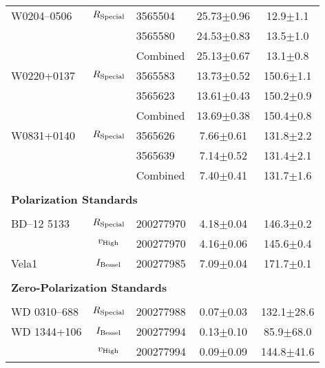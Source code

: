 \begin{table}
\begin{tabular}{lclcc}
        W0204--0506  & $R_{\rm Special}$ & 3565504   &           25.73$\pm$0.96 & \phantom{0}12.9$\pm$1.1 \\
                     &                   & 3565580   &           24.53$\pm$0.83 & \phantom{0}13.5$\pm$1.0 \\
                     &                   & Combined  &           25.13$\pm$0.67 & \phantom{0}13.1$\pm$0.8 \\
        W0220+0137   & $R_{\rm Special}$ & 3565583   &           13.73$\pm$0.52 &           150.6$\pm$1.1 \\
                     &                   & 3565623   &           13.61$\pm$0.43 &           150.2$\pm$0.9 \\
                     &                   & Combined  &           13.69$\pm$0.38 &           150.4$\pm$0.8 \\
        W0831+0140   & $R_{\rm Special}$ & 3565626   & \phantom{0}7.66$\pm$0.61 &           131.8$\pm$2.2 \\
                     &                   & 3565639   & \phantom{0}7.14$\pm$0.52 &           131.4$\pm$2.1 \\
                     &                   & Combined  & \phantom{0}7.40$\pm$0.41 &           131.7$\pm$1.6 \\
        \\
        \multicolumn{5}{l}{\bf{Polarization Standards}}\\\\
        BD--12 5133  & $R_{\rm Special}$ & 200277970 & \phantom{0}4.18$\pm$0.04 &           146.3$\pm$0.2 \\
                     & $v_{\rm High}$    & 200277970 & \phantom{0}4.16$\pm$0.06 &           145.6$\pm$0.4 \\
        Vela1        & $I_{\rm Bessel}$  & 200277985 & \phantom{0}7.09$\pm$0.04 &           171.7$\pm$0.1 \\
        \\
        \multicolumn{5}{l}{\bf{Zero-Polarization Standards}}\\\\
        WD 0310--688 & $R_{\rm Special}$ & 200277988 & \phantom{0}0.07$\pm$0.03 &          132.1$\pm$28.6 \\
        WD 1344+106  & $I_{\rm Bessel}$  & 200277994 & \phantom{0}0.13$\pm$0.10 & \phantom{0}85.9$\pm$68.0 \\
                     & $v_{\rm High}$    & 200277994 & \phantom{0}0.09$\pm$0.09 &          144.8$\pm$41.6 \\

\end{tabular}
\end{table}
